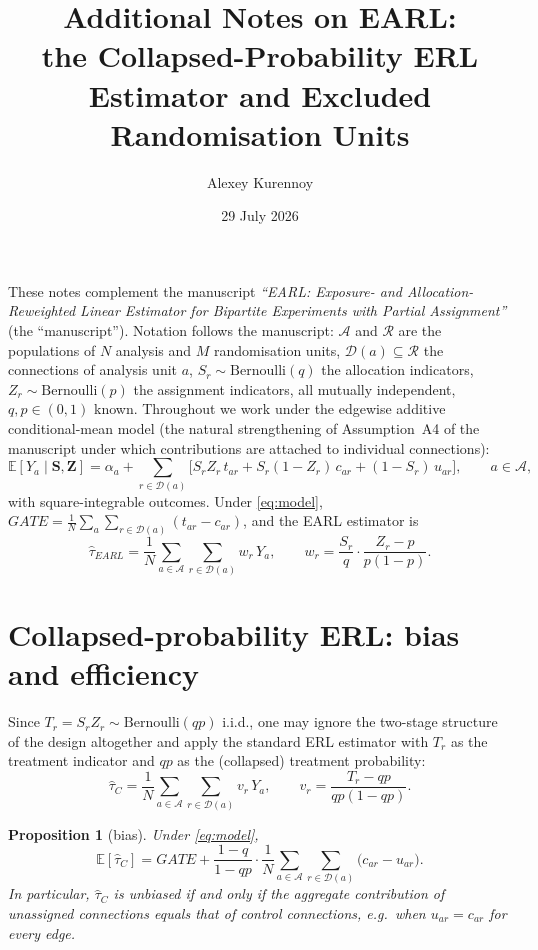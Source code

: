 \documentclass[11pt]{article}
\title{Additional Notes on EARL:\\ the Collapsed-Probability ERL Estimator and Excluded Randomisation Units}
\author{Alexey Kurennoy}
\date{29 July 2026}
\newtheorem{proposition}{Proposition}
\theoremstyle{remark}
\newcommand{\E}{\mathbb{E}}
\begin{document}
\maketitle

\noindent These notes complement the manuscript \emph{``EARL: Exposure- and Allocation-Reweighted Linear Estimator for Bipartite Experiments with Partial Assignment''} (the ``manuscript''). Notation follows the manuscript: $\mathcal A$ and $\mathcal R$ are the populations of $N$ analysis and $M$ randomisation units, $\mathcal D(a) \subseteq \mathcal R$ the connections of analysis unit $a$, $S_r \sim \mathrm{Bernoulli}(q)$ the allocation indicators, $Z_r \sim \mathrm{Bernoulli}(p)$ the assignment indicators, all mutually independent, $q, p \in (0,1)$ known. Throughout we work under the edgewise additive conditional-mean model (the natural strengthening of Assumption~A4 of the manuscript under which contributions are attached to individual connections):
\begin{equation}\label{eq:model}
\E[Y_a \mid \mathbf S, \mathbf Z]
= \alpha_a + \sum_{r\in\mathcal D(a)} \Big[ S_r Z_r\, t_{ar} + S_r(1-Z_r)\, c_{ar} + (1-S_r)\, u_{ar} \Big],
\qquad a \in \mathcal A,
\end{equation}
with square-integrable outcomes. Under \eqref{eq:model}, $GATE = \frac1N\sum_a \sum_{r\in\mathcal D(a)}(t_{ar}-c_{ar})$, and the EARL estimator is
\[
\hat\tau_{EARL} = \frac 1N \sum_{a\in\mathcal A}\sum_{r\in\mathcal D(a)} w_r\, Y_a,
\qquad
w_r = \frac{S_r}{q}\cdot\frac{Z_r-p}{p(1-p)} .
\]

\section{Collapsed-probability ERL: bias and efficiency}\label{sec:note1}

Since $T_r = S_r Z_r \sim \mathrm{Bernoulli}(qp)$ i.i.d., one may ignore the two-stage structure of the design altogether and apply the standard ERL estimator with $T_r$ as the treatment indicator and $qp$ as the (collapsed) treatment probability:
\begin{equation}\label{eq:collapsed}
\hat\tau_{C} = \frac 1N \sum_{a\in\mathcal A}\sum_{r\in\mathcal D(a)} v_r\, Y_a,
\qquad
v_r = \frac{T_r - qp}{qp(1-qp)} .
\end{equation}

\begin{proposition}[bias]\label{prop:c-bias}
Under \eqref{eq:model},
\[
\E[\hat\tau_{C}] = GATE + \frac{1-q}{1-qp}\cdot\frac 1N \sum_{a\in\mathcal A}\sum_{r\in\mathcal D(a)} \big(c_{ar} - u_{ar}\big).
\]
In particular, $\hat\tau_C$ is unbiased if and only if the aggregate contribution of unassigned connections equals that of control connections, e.g.\ when $u_{ar} = c_{ar}$ for every edge.
\end{proposition}
\end{document}
